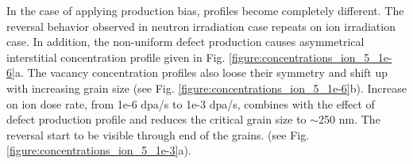 \documentclass[a4paper]{article}
\begin{document}
      \newpage
      In the case of applying production bias, profiles become completely different. The reversal behavior observed in neutron irradiation case repeats on ion irradiation case. In addition, the non-uniform defect production causes asymmetrical interstitial concentration profile given in Fig. \ref{figure:concentrations_ion_5_1e-6}a. The vacancy concentration profiles also loose their symmetry and shift up with increasing grain size (see Fig. \ref{figure:concentrations_ion_5_1e-6}b). Increase on ion dose rate, from 1e-6 dpa/s to 1e-3 dpa/s, combines with the effect of defect production profile and reduces the critical grain size to ${\sim}$250 nm. The reversal start to be visible through end of the grains. (see Fig. \ref{figure:concentrations_ion_5_1e-3}a).
      \begin{figure}[h!]  %
        \centering
        \qquad

\end{figure}
\end{document}
